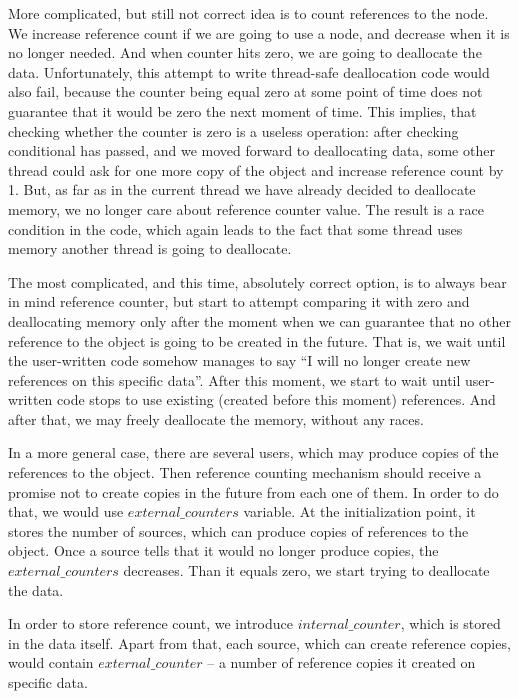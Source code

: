 \documentclass{article}
\begin{document}
More complicated, but still not correct idea is to count references to the node. We increase reference count if we are going to use a node, and decrease when it is no longer needed. And when counter hits zero, we are going to deallocate the data. Unfortunately, this attempt to write thread-safe deallocation code would also fail, because the counter being equal zero at some point of time does not guarantee that it would be zero the next moment of time. This implies, that checking whether the counter is zero is a useless operation: after checking conditional has passed, and we moved forward to deallocating data, some other thread could ask for one more copy of the object and increase reference count by 1. But, as far as in the current thread we have already decided to deallocate memory, we no longer care about reference counter value. The result is a race condition in the code, which again leads to the fact that some thread uses memory another thread is going to deallocate.

The most complicated, and this time, absolutely correct option, is to always bear in mind reference counter, but start to attempt comparing it with zero and deallocating memory only after the moment when we can guarantee that no other reference to the object is going to be created in the future. That is, we wait until the user-written code somehow manages to say ``I will no longer create new references on this specific data''. After this moment, we start to wait until user-written code stops to use existing (created before this moment) references. And after that, we may freely deallocate the memory, without any races.

In a more general case, there are several users, which may produce copies of the references to the object. Then reference counting mechanism should receive a promise not to create copies in the future from each one of them. In order to do that, we would use $external\_counters$ variable. At the initialization point, it stores the number of sources, which can produce copies of references to the object. Once a source tells that it would no longer produce copies, the $external\_counters$ decreases. Than it equals zero, we start trying to deallocate the data.

In order to store reference count, we introduce $internal\_counter$, which is stored in the data itself. Apart from that, each source, which can create reference copies, would contain $external\_counter$ -- a number of reference copies it created on specific data.
\end{document}
